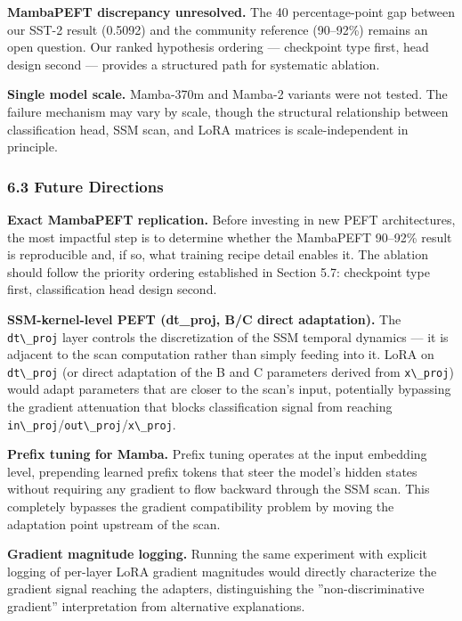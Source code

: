 \textbf{MambaPEFT discrepancy unresolved.} The 40 percentage-point gap between our SST-2 result (0.5092) and the community reference (90--92\%) remains an open question. Our ranked hypothesis ordering --- checkpoint type first, head design second --- provides a structured path for systematic ablation.

\textbf{Single model scale.} Mamba-370m and Mamba-2 variants were not tested. The failure mechanism may vary by scale, though the structural relationship between classification head, SSM scan, and LoRA matrices is scale-independent in principle.

\subsubsection{6.3 Future Directions}

\textbf{Exact MambaPEFT replication.} Before investing in new PEFT architectures, the most impactful step is to determine whether the MambaPEFT 90--92\% result is reproducible and, if so, what training recipe detail enables it. The ablation should follow the priority ordering established in Section 5.7: checkpoint type first, classification head design second.

\textbf{SSM-kernel-level PEFT (dt\_proj, B/C direct adaptation).} The \texttt{dt\textbackslash \_proj} layer controls the discretization of the SSM temporal dynamics --- it is adjacent to the scan computation rather than simply feeding into it. LoRA on \texttt{dt\textbackslash \_proj} (or direct adaptation of the B and C parameters derived from \texttt{x\textbackslash \_proj}) would adapt parameters that are closer to the scan's input, potentially bypassing the gradient attenuation that blocks classification signal from reaching \texttt{in\textbackslash \_proj}/\texttt{out\textbackslash \_proj}/\texttt{x\textbackslash \_proj}.

\textbf{Prefix tuning for Mamba.} Prefix tuning operates at the input embedding level, prepending learned prefix tokens that steer the model's hidden states without requiring any gradient to flow backward through the SSM scan. This completely bypasses the gradient compatibility problem by moving the adaptation point upstream of the scan.

\textbf{Gradient magnitude logging.} Running the same experiment with explicit logging of per-layer LoRA gradient magnitudes would directly characterize the gradient signal reaching the adapters, distinguishing the ''non-discriminative gradient'' interpretation from alternative explanations.

